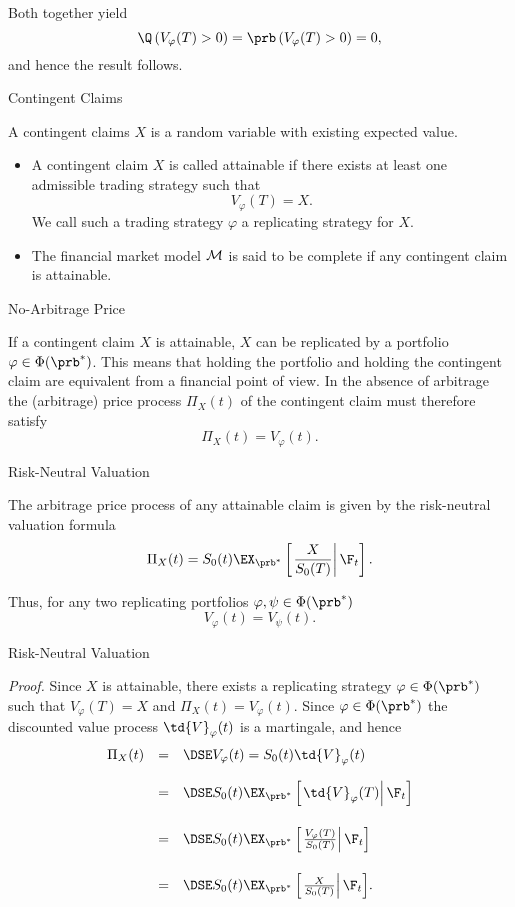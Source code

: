 Both together yield
$$
\Q\left(V_\varphi(T) > 0\right) = \prb\left(V_\varphi(T) >
0\right) =0,
$$
and hence the result follows.\hfill \eb





{ Contingent Claims}

A contingent claims $X$ is a random variable with existing expected value.
\begin{itemize}
\item<1-> A contingent claim $X$ is called attainable if there
exists at least one admissible trading strategy such that
$$
V_\varphi(T) = X.
$$
We call such a  trading strategy $\varphi$ a replicating strategy
for $X$. \item<2-> The financial market model ${\cal M}$ is said
to be complete if any contingent claim is attainable.

\end{itemize}








{ No-Arbitrage Price}

If a contingent claim $X$ is attainable, $X$ can be replicated by
a portfolio $\varphi \in \Phi(\prb^*)$. This means that holding
the portfolio and holding the contingent claim are equivalent from
a financial point of view. In the absence of arbitrage the
(arbitrage) price process $\Pi_X(t)$ of the contingent claim must
therefore satisfy
$$
\Pi_X(t) = V_\varphi(t).
$$







{ Risk-Neutral Valuation}

The arbitrage price process of
any attainable claim is given by the risk-neutral valuation
formula
$$
\Pi_X(t) = S_0(t)
\EX_{\prb^*}\left[\left.\frac{X}{S_0(T)}\right|\F_t\right].
$$


Thus, for any two replicating portfolios $\varphi, \psi \in
\Phi(\prb^*)$
$$
V_\varphi(t) = V_\psi(t).
$$







{ Risk-Neutral Valuation}

{\it Proof.} Since $X$ is
attainable, there exists a replicating strategy $\varphi \in
\Phi(\prb^*)$ such that $V_\varphi(T) = X$ and $\Pi_X(t) =
V_\varphi(t)$. Since $\varphi \in \Phi(\prb^*)$ the discounted
value process $\td{V}_\varphi(t)$ is a martingale, and hence
$$
\begin{array}{lll}
\Pi_X(t) &=&\DSE V_\varphi(t) = S_0(t)\td{V}_\varphi(t) \\*[12pt]
&=&\DSE S_0(t) \EX_{\prb^*}
\left[\left.\td{V}_\varphi(T)\right|\F_t\right]\\*[18pt]
&=&\DSE S_0(t)
\EX_{\prb^*}
\left[\left.\frac{V_\varphi(T)}{S_0(T)}\right|\F_t\right]\\*[18pt]
&=&\DSE S_0(t) \EX_{\prb^*}
\left[\left.\frac{X}{S_0(T)}\right|\F_t\right]\!.
\end{array}
$$
\hfill \eb





